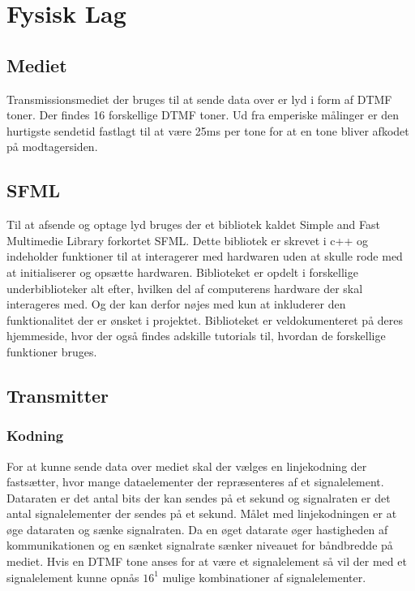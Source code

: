 \section{Fysisk Lag}

\subsection{Mediet}
Transmissionsmediet der bruges til at sende data over er lyd i form af DTMF toner. Der findes 16 forskellige DTMF toner. Ud fra emperiske målinger er den hurtigste sendetid fastlagt til at være 25ms per tone for at en tone bliver afkodet på modtagersiden.

\subsection{SFML}
Til at afsende og optage lyd bruges der et bibliotek kaldet Simple and Fast Multimedie Library forkortet SFML. Dette bibliotek er skrevet i c++ og indeholder funktioner til at interagerer med hardwaren uden at skulle rode med at initialiserer og opsætte hardwaren. Biblioteket er opdelt i forskellige underbiblioteker alt efter, hvilken del af computerens hardware der skal interageres med. Og der kan derfor nøjes med kun at inkluderer den funktionalitet der er ønsket i projektet. Biblioteket er veldokumenteret på deres hjemmeside, hvor der også findes adskille tutorials til, hvordan de forskellige funktioner bruges.

\subsection{Transmitter}


\subsubsection{Kodning}
For at kunne sende data over mediet skal der vælges en linjekodning der fastsætter, hvor mange dataelementer der repræsenteres af et signalelement. Dataraten er det antal bits der kan sendes på et sekund og signalraten er det antal signalelementer der sendes på et sekund. Målet med linjekodningen er at øge dataraten og sænke signalraten. Da en øget datarate øger hastigheden af kommunikationen og en sænket signalrate sænker niveauet for båndbredde på mediet. Hvis en DTMF tone anses for at være et signalelement så vil der med et signalelement kunne opnås $16^{1}$ mulige kombinationer af signalelementer. 


